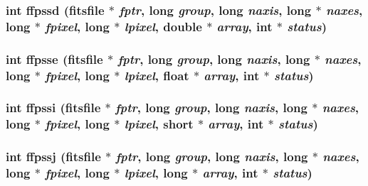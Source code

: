 \subsubsection{\setlength{\rightskip}{0pt plus 5cm}int ffpssd (\bf{fitsfile} $\ast$ {\em fptr}, long {\em group}, long {\em naxis}, long $\ast$ {\em naxes}, long $\ast$ {\em fpixel}, long $\ast$ {\em lpixel}, double $\ast$ {\em array}, int $\ast$ {\em status})}\label{test_2roimasker_2fitsio_8h_005342a1cc091d589dbc8dbfdc577e32}


\subsubsection{\setlength{\rightskip}{0pt plus 5cm}int ffpsse (\bf{fitsfile} $\ast$ {\em fptr}, long {\em group}, long {\em naxis}, long $\ast$ {\em naxes}, long $\ast$ {\em fpixel}, long $\ast$ {\em lpixel}, float $\ast$ {\em array}, int $\ast$ {\em status})}\label{test_2roimasker_2fitsio_8h_622b3a307ccbbbba93b0cf910a9c4091}


\subsubsection{\setlength{\rightskip}{0pt plus 5cm}int ffpssi (\bf{fitsfile} $\ast$ {\em fptr}, long {\em group}, long {\em naxis}, long $\ast$ {\em naxes}, long $\ast$ {\em fpixel}, long $\ast$ {\em lpixel}, short $\ast$ {\em array}, int $\ast$ {\em status})}\label{test_2roimasker_2fitsio_8h_2cf8bd9e8aec6e36d824b4fd9b34b9e0}


\subsubsection{\setlength{\rightskip}{0pt plus 5cm}int ffpssj (\bf{fitsfile} $\ast$ {\em fptr}, long {\em group}, long {\em naxis}, long $\ast$ {\em naxes}, long $\ast$ {\em fpixel}, long $\ast$ {\em lpixel}, long $\ast$ {\em array}, int $\ast$ {\em status})}\label{test_2roimasker_2fitsio_8h_ed68d2a2c51c19b9579ca7db53e148c5}


